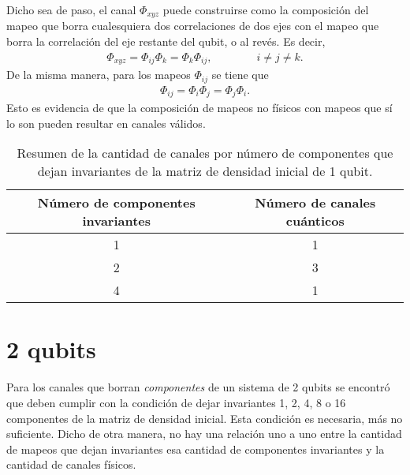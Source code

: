\documentclass[11pt]{article}
\begin{document}
Dicho sea de paso, el canal $\Phi_{xyz}$ puede construirse como la composición del mapeo que borra cualesquiera dos correlaciones de dos ejes con el mapeo que borra la correlación del eje restante del qubit, o al revés. Es decir, 
\begin{align}
	\Phi _{xyz} = \Phi _{ij}\Phi _{k} = \Phi _{k}\Phi _{ij}, \qquad \qquad i \neq j \neq k .
\end{align} De la misma manera, para los mapeos $\Phi _{ij}$ se tiene que
\begin{align}
	\Phi _{ij} = \Phi _i \Phi _j = \Phi _j \Phi _i. 
\end{align} Esto es evidencia de que la composición de mapeos no físicos con mapeos que sí lo son pueden resultar en canales válidos. 

\begin{table}[H]
\centering
\begin{tabular}{|c|c|}
\hline
\textbf{Número de componentes invariantes} & \textbf{Número de canales cuánticos} \\ \hline
1                                          & 1                                    \\ \hline
2                                          & 3                                    \\ \hline
4                                          & 1                                    \\ \hline
\end{tabular}
\caption{Resumen de la cantidad de canales por número de componentes que dejan invariantes de la matriz de densidad inicial de 1 qubit.}
\label{tab:1qbit}
\end{table}

\section*{2 qubits}
Para los canales que borran \textit{componentes} de un sistema de 2 qubits se encontró que deben cumplir con la condición de dejar invariantes 1, 2, 4, 8 o 16 componentes de la matriz de densidad inicial. Esta condición es necesaria, más no suficiente. Dicho de otra manera, no hay una relación uno a uno entre la cantidad de mapeos que dejan invariantes esa cantidad de componentes invariantes y la cantidad de canales físicos.\\
\end{document}
